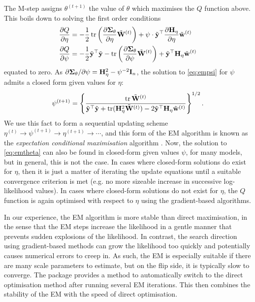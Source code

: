 The M-step assigns $\theta^{(t+1)}$ the value of $\theta$ which maximises the $Q$ function above.
This boils down to solving the first order conditions
\begin{align}
  \frac{\partial Q}{\partial\eta}
  &= -\frac{1}{2} \operatorname{tr} \left(\frac{\partial {\bm\Sigma}_\theta}{\partial\eta} \tilde{{\mathbf W}}^{(t)} \right) + \psi  \cdot \tilde{{\mathbf y}} ^\top \frac{\partial {\mathbf H}_\eta}{\partial\eta} \tilde{{\mathbf w}}^{(t)} \label{eq:emtheta} \\
  \frac{\partial Q}{\partial\psi}
  &= -\frac{1}{2} \tilde{{\mathbf y}}^\top\tilde{{\mathbf y}} - \operatorname{tr} \left(\frac{\partial {\bm\Sigma}_\theta}{\partial\psi} \tilde{{\mathbf W}}^{(t)} \right) + \tilde{{\mathbf y}}^\top {\mathbf H}_\eta \tilde{{\mathbf w}}^{(t)} \label{eq:empsi}
\end{align}
equated to zero.
As $\partial{\bm\Sigma}_\theta/\partial\psi = {\mathbf H}_\eta^2 - \psi^{-2}{\mathbf I}_n$, the solution to \cref{eq:empsi} for $\psi$ admits a closed form given values for $\eta$:
\begin{align}\label{eq:closedformpsi}
  \psi^{(t+1)} = 
  \left\{ \frac{\operatorname{tr} \tilde{\mathbf W}^{(t)}}{\tilde{{\mathbf y}}^\top\tilde{{\mathbf y}} + \operatorname{tr}({\mathbf H}_\eta^2\tilde{\mathbf W}^{(t)}) - 2\tilde{{\mathbf y}}^\top{\mathbf H}_\eta\tilde{\mathbf w}^{(t)}} \right\}^{1/2}.
\end{align}
We use this fact to form a sequential updating scheme $\eta^{(t)} \to \psi^{(t+1)} \to \eta^{(t+1)} \to \cdots$, and this form of the EM algorithm is known as the \emph{expectation conditional maximisation} algorithm \citep{meng1993maximum}.
Now, the solution to \cref{eq:emtheta} can also be found in closed-form given values $\psi$, for many models, but in general, this is not the case. 
In cases where closed-form solutions do exist for $\eta$, then it is just a matter of iterating the update equations until a suitable convergence criterion is met (e.g. no more sizeable increase in successive log-likelihood values).
In cases where closed-form solutions do not exist for $\eta$, the $Q$ function is again optimised with respect to $\eta$ using the gradient-based algorithms.

In our experience, the EM algorithm is more stable than direct maximisation, in the sense that the EM steps increase the likelihood in a gentle manner that prevents sudden explosions of the likelihood.
In contrast, the search direction using gradient-based methods can grow the likelihood too quickly and potentially causes numerical errors to creep in.
As such, the EM is especially suitable if there are many scale parameters to estimate, but on the flip side, it is typically slow to converge.
The  package provides a method to automatically switch to the direct optimisation method after running several EM iterations.
This then combines the stability of the EM with the speed of direct optimisation.

